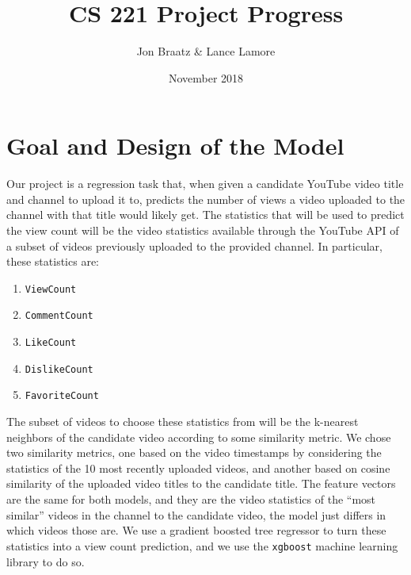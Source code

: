 \documentclass[12pt]{article}
\title{CS 221 Project Progress}
\author{Jon Braatz \& Lance Lamore}
\date{November 2018}
\theoremstyle{definition}
\theoremstyle{remark}
\begin{document}
\maketitle

  
\section{Goal and Design of the Model}

Our project is a regression task that, when given a candidate YouTube
video title and channel to upload it to, predicts the number of views a video
uploaded to the channel with that title would likely get. The statistics that
will be used to predict the view count will be the video statistics available
through the YouTube API of a subset of videos previously uploaded to the
provided channel. In particular, these statistics are:
\begin{enumerate}
  \item \texttt{ViewCount}
  \item \texttt{CommentCount}
  \item \texttt{LikeCount}
  \item \texttt{DislikeCount}
  \item \texttt{FavoriteCount}
  \end{enumerate}
The subset of videos to choose these statistics from will be the k-nearest
neighbors of the candidate video according to some similarity metric.
We chose two similarity metrics, one based on the video timestamps by considering
the statistics of the 10 most recently uploaded videos, and another based on
cosine similarity of the uploaded video titles to the candidate title.
The feature vectors are the same for both
models, and they are the video statistics of the ``most similar'' videos in the
channel to the candidate video, the model just differs in which videos those are.
We use a gradient boosted tree regressor to turn these statistics into a view
count prediction, and we use the \texttt{xgboost} machine learning library to do
so.
\end{document}
